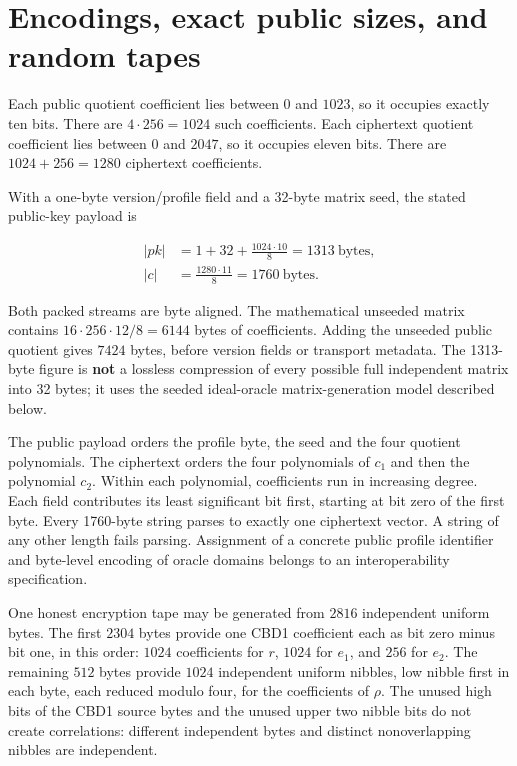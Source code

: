 \documentclass[
  11pt,
  a4paper,
  oneside]{report}
\begin{document}
\section{Encodings, exact public sizes, and random
tapes}\label{encodings-exact-public-sizes-and-random-tapes}

Each public quotient coefficient lies between \(0\) and \(1023\), so it
occupies exactly ten bits. There are \(4\cdot256=1024\) such
coefficients. Each ciphertext quotient coefficient lies between \(0\)
and \(2047\), so it occupies eleven bits. There are \(1024+256=1280\)
ciphertext coefficients.

With a one-byte version/profile field and a 32-byte matrix seed, the
stated public-key payload is

\[
\begin{aligned}
|pk|&=1+32+\frac{1024\cdot10}{8}=1313\ \text{bytes},\\
|c|&=\frac{1280\cdot11}{8}=1760\ \text{bytes}.
\end{aligned}
\]

Both packed streams are byte aligned. The mathematical unseeded matrix
contains \(16\cdot256\cdot12/8=6144\) bytes of coefficients. Adding the
unseeded public quotient gives \(7424\) bytes, before version fields or
transport metadata. The 1313-byte figure is \textbf{not} a lossless
compression of every possible full independent matrix into 32 bytes; it
uses the seeded ideal-oracle matrix-generation model described below.

The public payload orders the profile byte, the seed and the four
quotient polynomials. The ciphertext orders the four polynomials of
\(c_1\) and then the polynomial \(c_2\). Within each polynomial,
coefficients run in increasing degree. Each field contributes its least
significant bit first, starting at bit zero of the first byte. Every
1760-byte string parses to exactly one ciphertext vector. A string of
any other length fails parsing. Assignment of a concrete public profile
identifier and byte-level encoding of oracle domains belongs to an
interoperability specification.

One honest encryption tape may be generated from \(2816\) independent
uniform bytes. The first \(2304\) bytes provide one CBD1 coefficient
each as bit zero minus bit one, in this order: \(1024\) coefficients for
\(r\), \(1024\) for \(e_1\), and \(256\) for \(e_2\). The remaining
\(512\) bytes provide \(1024\) independent uniform nibbles, low nibble
first in each byte, each reduced modulo four, for the coefficients of
\(\rho\). The unused high bits of the CBD1 source bytes and the unused
upper two nibble bits do not create correlations: different independent
bytes and distinct nonoverlapping nibbles are independent.
\end{document}
